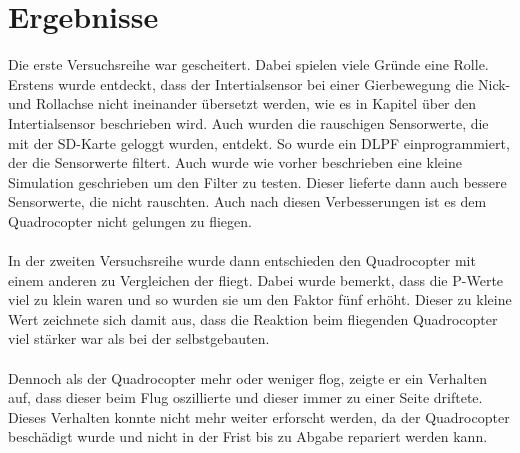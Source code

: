\documentclass[12pt,a4paper, ngerman]{article}
\begin{document}
\section{Ergebnisse}
Die erste Versuchsreihe war gescheitert. Dabei spielen viele Gründe eine Rolle. Erstens wurde entdeckt, dass der Intertialsensor bei einer Gierbewegung die Nick-und Rollachse nicht ineinander übersetzt werden, wie es in Kapitel über den Intertialsensor beschrieben wird. Auch wurden die rauschigen Sensorwerte, die mit der SD-Karte geloggt wurden, entdekt. So wurde ein DLPF einprogrammiert, der die Sensorwerte filtert. Auch wurde wie vorher beschrieben eine kleine Simulation geschrieben um den Filter zu testen. Dieser lieferte dann auch bessere Sensorwerte, die nicht rauschten. Auch nach diesen Verbesserungen ist es dem Quadrocopter nicht gelungen zu fliegen. \\ \\In der zweiten Versuchsreihe wurde dann entschieden den Quadrocopter mit einem anderen zu Vergleichen der fliegt. Dabei wurde bemerkt, dass die P-Werte viel zu klein waren und so wurden sie um den Faktor fünf erhöht. Dieser zu kleine Wert zeichnete sich damit aus, dass die Reaktion beim fliegenden Quadrocopter viel stärker war als bei der selbstgebauten. \\ \\ Dennoch als der Quadrocopter mehr oder weniger flog, zeigte er ein Verhalten auf, dass dieser beim Flug oszillierte und dieser immer zu einer Seite driftete. Dieses Verhalten konnte nicht mehr weiter erforscht werden, da der Quadrocopter beschädigt wurde und nicht in der Frist bis zu Abgabe repariert werden kann.
\newpage
\end{document}
